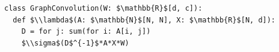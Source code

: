 \documentclass[border=10pt]{standalone}
\begin{document}
\begin{lstlisting}
class GraphConvolution(W: $\mathbb{R}$[d, c]):
  def $\\lambda$(A: $\mathbb{N}$[N, N], X: $\mathbb{R}$[N, d]):
    D = for j: sum(for i: A[i, j])
    $\\sigma$(D$^{-1}$*A*X*W)
\end{lstlisting}
\end{document}
